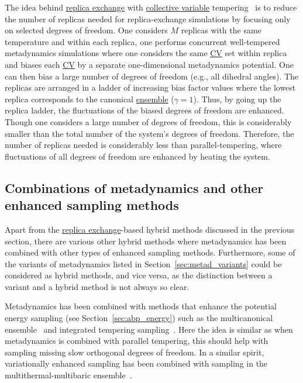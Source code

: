 \documentclass[9pt,review]{livecoms}
\begin{document}
The idea behind \hyperlink{ref:ReplEx} {replica exchange} with \hyperlink{ref:CV} {collective variable} tempering~\cite{Gil-Ley_JCTC-2015} is to reduce the number of replicas needed for replica-exchange simulations by focusing only on selected degrees of freedom. One considers $M$ replicas with the same temperature and within each replica, one performs concurrent well-tempered metadynamics simulations where one considers the same \hyperlink{ref:CV} {CV} set within replica and biases each \hyperlink{ref:CV} {CV} by a separate one-dimensional metadynamics potential. One can then bias a large number of degrees of freedom (e.g., all dihedral angles). The replicas are arranged in a ladder of increasing bias factor values where the lowest replica corresponds to the canonical \hyperlink{ref:Ensemble} {ensemble} ($\gamma=1$). Thus, by going up the replica ladder, the fluctuations of the biased degrees of freedom are enhanced. Though one considers a large number of degrees of freedom, this is considerably smaller than the total number of the system's degrees of freedom. Therefore, the number of replicas needed is considerably less than parallel-tempering, where fluctuations of all degrees of freedom are enhanced by heating the system.

\subsection{Combinations of metadynamics and other enhanced sampling methods}

Apart from the \hyperlink{ref:ReplEx} {replica exchange}-based hybrid methods discussed in the previous section, there are various other hybrid methods where metadynamics has been combined with other types of enhanced sampling methods. Furthermore, some of the variants of metadynamics listed in Section~\ref{sec:metad_variants} could be considered as hybrid methods, and vice versa, as the distinction between a variant and a hybrid method is not always so clear.

Metadynamics has been combined with methods that enhance the potential energy sampling (see Section~\ref{sec:abp_energy}) such as the multicanonical ensemble~\cite{Yonezawa_MulticanonicalMetaD_2011} and integrated tempering sampling~\cite{Yang_MetaD-ITS_1_2016,Yang_MetaD-ITS_2_2018}. Here the idea is similar as when metadynamics is combined with parallel tempering, this should help with sampling missing slow orthogonal degrees of freedom. In a similar spirit, variationally enhanced sampling has been combined with sampling in the multithermal-multibaric ensemble~\cite{Piaggi_MultiVES_2019,Piaggi_MultiVES+CV_2019}.
\end{document}
